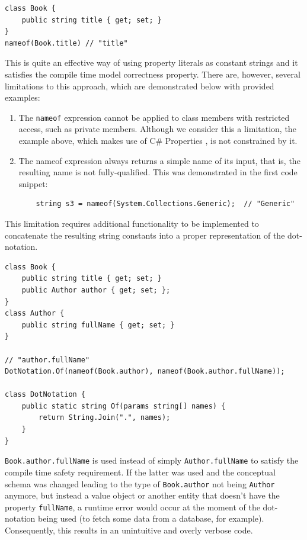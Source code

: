 \begin{verbatim}
class Book {
    public string title { get; set; }
}
nameof(Book.title) // "title"
\end{verbatim}

This is quite an effective way of using property literals as constant strings and it satisfies the compile time model correctness property. There are, however, several limitations to this approach, which are demonstrated below with provided examples:

\begin{enumerate}
    \item The \texttt{nameof} expression cannot be applied to class members with restricted access, such as private members. Although we consider this a limitation, the example above, which makes use of C\# Properties \cite{cSharp-props}, is not constrained by it.

    \item The nameof expression always returns a simple name of its input, that is, the resulting name is not fully-qualified. This was demonstrated in the first code snippet:
\begin{verbatim}
    string s3 = nameof(System.Collections.Generic);  // "Generic"
\end{verbatim}

\end{enumerate}

This limitation requires additional functionality to be implemented to concatenate the resulting string constants into a proper representation of the dot-notation.

\begin{verbatim}
class Book {
    public string title { get; set; }
    public Author author { get; set; };
}
class Author {
    public string fullName { get; set; }
}

// "author.fullName"
DotNotation.Of(nameof(Book.author), nameof(Book.author.fullName));

class DotNotation {
    public static string Of(params string[] names) {
        return String.Join(".", names);
    }
}
\end{verbatim}

\texttt{Book.author.fullName} is used instead of simply \texttt{Author.fullName} to satisfy the compile time safety requirement. If the latter was used and the conceptual schema was changed leading to the type of \texttt{Book.author} not being \texttt{Author} anymore, but instead a value object or another entity that doesn’t have the property \texttt{fullName}, a runtime error would occur at the moment of the dot-notation being used (to fetch some data from a database, for example). Consequently, this results in an unintuitive and overly verbose code.


